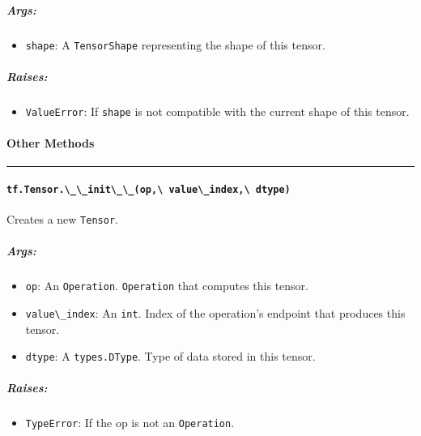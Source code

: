 \subparagraph{Args: }\label{args-16}

\begin{itemize}
\tightlist
\item
  \lstinline{shape}: A \lstinline{TensorShape} representing the shape of this
  tensor.
\end{itemize}

\subparagraph{Raises: }\label{raises-8}

\begin{itemize}
\tightlist
\item
  \lstinline{ValueError}: If \lstinline{shape} is not compatible with the
  current shape of this tensor.
\end{itemize}

\paragraph{Other Methods }\label{other-methods-1}

\begin{center}\rule{0.5\linewidth}{\linethickness}\end{center}

\paragraph{\texorpdfstring{\lstinline{tf.Tensor.\_\_init\_\_(op,\ value\_index,\ dtype)}
}{tf.Tensor.\_\_init\_\_(op, value\_index, dtype) }}\label{tf.tensor.ux5fux5finitux5fux5fop-valueux5findex-dtype}

Creates a new \lstinline{Tensor}.

\subparagraph{Args: }\label{args-17}

\begin{itemize}
\tightlist
\item
  \lstinline{op}: An \lstinline{Operation}. \lstinline{Operation} that computes
  this tensor.
\item
  \lstinline{value\_index}: An \lstinline{int}. Index of the operation's
  endpoint that produces this tensor.
\item
  \lstinline{dtype}: A \lstinline{types.DType}. Type of data stored in this
  tensor.
\end{itemize}

\subparagraph{Raises: }\label{raises-9}

\begin{itemize}
\tightlist
\item
  \lstinline{TypeError}: If the op is not an \lstinline{Operation}.
\end{itemize}

